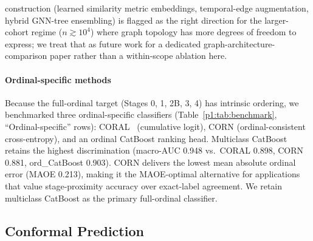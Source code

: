 construction (learned similarity metric embeddings, temporal-edge augmentation, hybrid GNN-tree ensembling) is flagged as the right direction for the larger-cohort regime ($n \gtrsim 10^4$) where graph topology has more degrees of freedom to express; we treat that as future work for a dedicated graph-architecture-comparison paper rather than a within-scope ablation here.

\paragraph*{Ordinal-specific methods} Because the full-ordinal target (Stages 0, 1, 2B, 3, 4) has intrinsic ordering, we benchmarked three ordinal-specific classifiers (Table~\ref{p1:tab:benchmark}, ``Ordinal-specific'' rows): CORAL~\cite{bonnier2022ordinal} (cumulative logit), CORN (ordinal-consistent cross-entropy), and an ordinal CatBoost ranking head. Multiclass CatBoost retains the highest discrimination (macro-AUC 0.948 vs.\ CORAL 0.898, CORN 0.881, ord\_CatBoost 0.903). CORN delivers the lowest mean absolute ordinal error (MAOE 0.213), making it the MAOE-optimal alternative for applications that value stage-proximity accuracy over exact-label agreement. We retain multiclass CatBoost as the primary full-ordinal classifier.

\subsection{Conformal Prediction}

